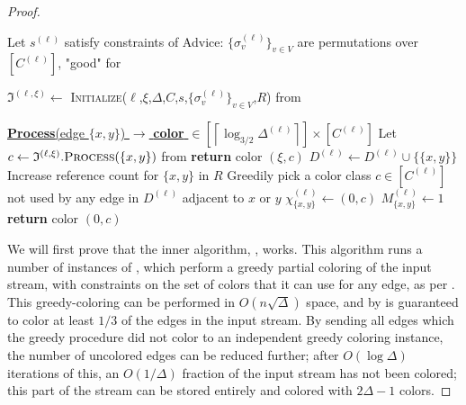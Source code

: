 \documentclass[10pt]{article}
\theoremstyle{definition}\newtheorem{definition}[lemma]{Definition}
\theoremstyle{remark}  \newtheorem*{remark}{Remark}
\newcommand{\ceil}[1]{{\left\lceil{#1}\right\rceil}}
\newcommand{\pell}{{(\ell)}} %
\newcommand{\pellxi}{{(\ell,\xi)}} %
\begin{document}
\begin{proof}
\begin{algorithm}[ht!]
\begin{algorithmic}[1]
        \If{ $\Delta^\pell \ge 256 \log(n/\delta))$}
          \State Let $s^\pell$ satisfy constraints of 
          \State Advice: $\{\sigma_v^\pell\}_{v \in V}$ are permutations over $[C^\pell]$, "good" for 
          
          \For{each \emph{layer} $\xi \in [\ceil{\log_{3/2}{\Delta^\pell}}]$}
            \State $\mathfrak{I}^\pellxi \gets$ \textsc{Initialize}($\ell$,$\xi$,$\Delta$,$C$,$s$,$\{\sigma_v^\pell\}_{v\in V}$,$R$) from 
          \EndFor
        \EndIf
      
    \Statex 
    \Statex\underline{\textbf{Process}(edge $\{x,y\}$) $\rightarrow$ \textbf{color} $\in \left[\ceil{\log_{3/2}{\Delta^\pell}}\right] \times \left[C^\pell\right]$}
        \If{$\Delta^\pell \ge 256 \log(n/\delta))$}
          \For{$\xi \in \left[\ceil{\log_{3/2}{\Delta^\pell}}\right]$}\label{step:loop-over-layers}
            \State Let $c \gets \mathfrak{I}^\pellxi.\textsc{Process}(\{x,y\})$ from 
              \State \textbf{return} color $(\xi, c)$
            \EndIf
          \EndFor
        \EndIf
        \State $D^\pell \gets D^\pell \cup \{\{x,y\}\}$\label{step:record-unpartialcolored-edge}
        \State Increase reference count for $\{x,y\}$ in $R$
        \State Greedily pick a color class $c \in [C^\pell]$ not used by any edge in $D^\pell$ adjacent to $x$ or $y$
        \State $\chi^\pell_{\{x,y\}} \gets (0,c)$
        \State $M^\pell_{\{x,y\}} \gets 1$
        \State \textbf{return} color $(0,  c)$
    \end{algorithmic}
  \end{algorithm}
  
  We will first prove that the inner algorithm, , works.
  This algorithm runs a number of instances of , which perform a greedy partial coloring of the input stream, with constraints on the set of colors that it can use for any edge, as per . This greedy-coloring can be performed
  in $O(n \sqrt{\Delta})$ space, and by  is guaranteed 
  to color at least $1/3$ of
  the edges in the input stream. By sending all edges which the greedy procedure
  did not color to an independent greedy coloring instance, the number of uncolored
  edges can be reduced further; after $O(\log \Delta)$ iterations of this, an $O(1/\Delta)$ fraction of the input stream has not been colored; this part of the stream can be stored entirely and colored with $2 \Delta - 1$ colors.
  

\end{proof}
\end{document}
